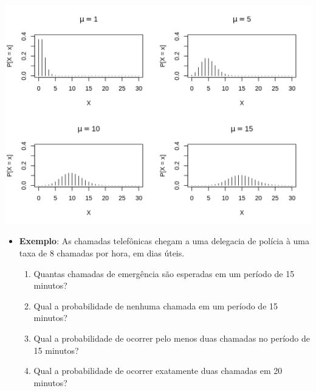 \documentclass[10pt,a4paper]{book}
\providecommand{\tightlist}{%
  \setlength{\itemsep}{0pt}\setlength{\parskip}{0pt}}
\begin{document}
\begin{center}\includegraphics{figures/unnamed-chunk-351-1} \end{center}

\begin{itemize}
\tightlist
\item
  \textbf{Exemplo}: As chamadas telefônicas chegam a uma delegacia de
  polícia à uma taxa de 8 chamadas por hora, em dias úteis.

  \begin{enumerate}
  \def\labelenumi{\alph{enumi}.}
  \tightlist
  \item
    Quantas chamadas de emergência são esperadas em um período de 15
    minutos?
  \item
    Qual a probabilidade de nenhuma chamada em um período de 15 minutos?
  \item
    Qual a probabilidade de ocorrer pelo menos duas chamadas no período
    de 15 minutos?
  \item
    Qual a probabilidade de ocorrer exatamente duas chamadas em 20
    minutos?
  \end{enumerate}
\end{itemize}
\end{document}
